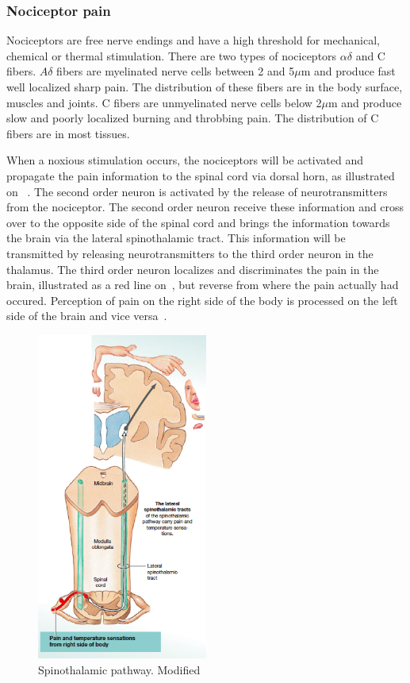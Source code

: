 \subsubsection{Nociceptor pain}
Nociceptors are free nerve endings and have a high threshold for mechanical, chemical or thermal stimulation. There are two types of nociceptors $\alpha\delta$ and C fibers. $A\delta$ fibers are myelinated nerve cells between 2 and 5$\mu$m and produce fast well localized sharp pain. The distribution of these fibers are in the body surface, muscles and joints. C fibers are unmyelinated nerve cells below 2$\mu$m and produce slow and poorly localized burning and throbbing pain. The distribution of C fibers are in most tissues. \cite{Steeds2013}

When a noxious stimulation occurs, the nociceptors will be activated and propagate the pain information to the spinal cord via dorsal horn, as illustrated on ~\cite{Martini2012}. The second order neuron is activated by the release of neurotransmitters from the nociceptor. The second order neuron receive these information and cross over to the opposite side of the spinal cord and brings the information towards the brain via the lateral spinothalamic tract. This information will be transmitted by releasing neurotransmitters to the third order neuron in the thalamus. The third order neuron localizes and discriminates the pain in the brain, illustrated as a red line on~, but reverse from where the pain actually had occured. Perception of pain on the right side of the body is processed on the left side of the brain and vice versa~\cite{Martini2012}. 


\begin{figure}[H]
	\includegraphics[width=0.5\textwidth]{figures/pathways.png} 
	\caption{Spinothalamic pathway. Modified~\cite{Martini2012}}
	\label{fig:pathways}  
\end{figure}   

